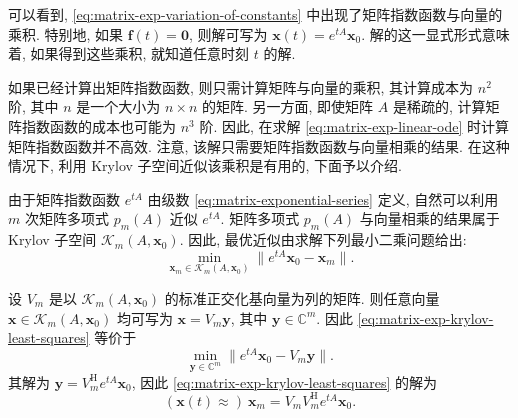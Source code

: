 {可以看到, \eqref{eq:matrix-exp-variation-of-constants} 中出现了矩阵指数函数与向量的乘积. 特别地, 如果 $\boldsymbol{f}(t)=\boldsymbol{0}$, 则解可写为 $\boldsymbol{x}(t)=e^{tA}\boldsymbol{x}_0$. 解的这一显式形式意味着, 如果得到这些乘积, 就知道任意时刻 $t$ 的解.}

{如果已经计算出矩阵指数函数, 则只需计算矩阵与向量的乘积, 其计算成本为 $n^2$ 阶, 其中 $n$ 是一个大小为 $n\times n$ 的矩阵. 另一方面, 即使矩阵 $A$ 是稀疏的, 计算矩阵指数函数的成本也可能为 $n^3$ 阶. 因此, 在求解 \eqref{eq:matrix-exp-linear-ode} 时计算矩阵指数函数并不高效. 注意, 该解只需要矩阵指数函数与向量相乘的结果. 在这种情况下, 利用 Krylov 子空间近似该乘积是有用的, 下面予以介绍.}

{由于矩阵指数函数 $e^{tA}$ 由级数 \eqref{eq:matrix-exponential-series} 定义, 自然可以利用 $m$ 次矩阵多项式 $p_m(A)$ 近似 $e^{tA}$. 矩阵多项式 $p_m(A)$ 与向量相乘的结果属于 Krylov 子空间 $\mathcal{K}_m(A,\boldsymbol{x}_0)$. 因此, 最优近似由求解下列最小二乘问题给出:}
\begin{equation}\label{eq:matrix-exp-krylov-least-squares}\min_{\boldsymbol{x}_m\in\mathcal{K}_m(A,\boldsymbol{x}_0)}\|e^{tA}\boldsymbol{x}_0-\boldsymbol{x}_m\|.\end{equation}

{设 $V_m$ 是以 $\mathcal{K}_m(A,\boldsymbol{x}_0)$ 的标准正交化基向量为列的矩阵. 则任意向量 $\boldsymbol{x}\in\mathcal{K}_m(A,\boldsymbol{x}_0)$ 均可写为 $\boldsymbol{x}=V_m\boldsymbol{y}$, 其中 $\boldsymbol{y}\in\mathbb{C}^m$. 因此 \eqref{eq:matrix-exp-krylov-least-squares} 等价于}
\[\min_{\boldsymbol{y}\in\mathbb{C}^m}\|e^{tA}\boldsymbol{x}_0-V_m\boldsymbol{y}\|.\]
{其解为 $\boldsymbol{y}=V_m^{\mathrm H}e^{tA}\boldsymbol{x}_0$, 因此 \eqref{eq:matrix-exp-krylov-least-squares} 的解为}
\begin{equation}\label{eq:matrix-exp-krylov-projection}(\boldsymbol{x}(t)\approx)\ \boldsymbol{x}_m=V_mV_m^{\mathrm H}e^{tA}\boldsymbol{x}_0.\end{equation}

